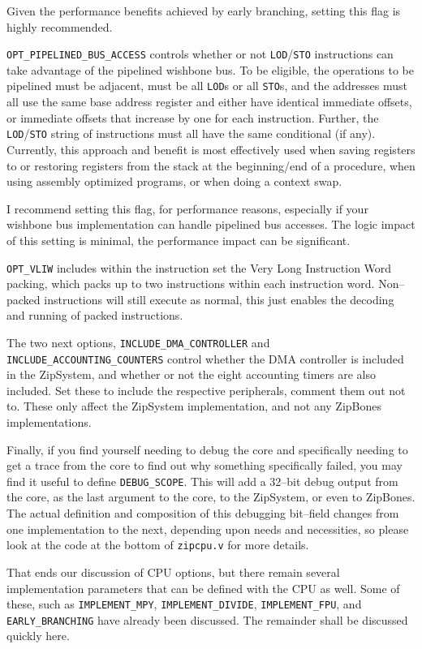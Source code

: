 \documentclass{gqtekspec}
\begin{document}
Given the performance benefits achieved by early branching, setting this flag
is highly recommended.

{\tt OPT\_PIPELINED\_BUS\_ACCESS} controls whether or not {\tt LOD}/{\tt STO}
instructions can take advantage of the pipelined wishbone bus.  To be
eligible, the operations to be pipelined must be adjacent, must be all
{\tt LOD}s or all {\tt STO}s, and the addresses must all use the same base
address register and either have identical immediate offsets, or immediate
offsets that increase by one for each instruction.  Further, the
{\tt LOD}/{\tt STO} string of instructions must all have the same conditional
(if any).  Currently, this approach and benefit is most effectively used
when saving registers to or restoring registers from the stack at the
beginning/end of a procedure, when using assembly optimized programs, or
when doing a context swap.

I recommend setting this flag, for performance reasons, especially if your
wishbone bus implementation can handle pipelined bus accesses.  The logic
impact of this setting is minimal, the performance impact can be significant.

{\tt OPT\_VLIW} includes within the instruction set the Very Long Instruction
Word packing, which packs up to two instructions within each instruction word.
Non--packed instructions will still execute as normal, this just enables the
decoding and running of packed instructions.

The two next options, {\tt INCLUDE\_DMA\_CONTROLLER} and
{\tt INCLUDE\_ACCOUNTING\_COUNTERS}
control whether the DMA controller is included in the ZipSystem, and
whether or not the eight accounting timers are also included.  Set these to
include the respective peripherals, comment them out not to.  These only 
affect the ZipSystem implementation, and not any ZipBones implementations.

Finally, if you find yourself needing to debug the core and specifically needing
to get a trace from the core to find out why something specifically failed,
you may find it useful to define {\tt DEBUG\_SCOPE}.  This will add a 32--bit
debug output from the core, as the last argument to the core, to the ZipSystem,
or even to ZipBones.  The actual definition and composition of this debugging
bit--field changes from one implementation to the next, depending upon needs
and necessities, so please look at the code at the bottom of {\tt zipcpu.v}
for more details.

That ends our discussion of CPU options, but there remain several implementation
parameters that can be defined with the CPU as well.  Some of these, such as
{\tt IMPLEMENT\_MPY}, {\tt IMPLEMENT\_DIVIDE}, {\tt IMPLEMENT\_FPU}, and
{\tt EARLY\_BRANCHING} have already been discussed. The remainder shall be
discussed quickly here.
\end{document}
